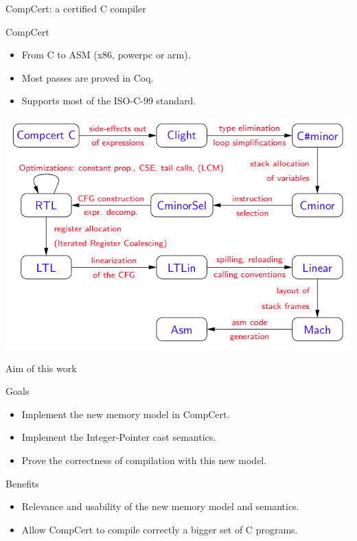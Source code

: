 \begin{frame}{CompCert: a certified C compiler}

  \begin{block}{CompCert}
    \begin{itemize}
      \item From C to ASM (x86, powerpc or arm).
      \item Most passes are proved in Coq.
      \item Supports most of the ISO-C-99 standard.
    \end{itemize}
  \end{block}
  \vfill
  \begin{center}
    \includegraphics[scale=0.6]{img/passes.png}
  \end{center}
  
\end{frame}


\begin{frame}{Aim of this work}
  
  \begin{block}{Goals}
    \begin{itemize}
    \item Implement the new memory model in CompCert.
    \item Implement the Integer-Pointer cast semantics.
    \item Prove the correctness of compilation with this new model.
    \end{itemize}
  \end{block}
  \vfill
  \begin{exampleblock}{Benefits}
    \begin{itemize}
    \item Relevance and usability of the new memory model and semantics.
    \item Allow CompCert to compile correctly a bigger set of C programs.
    \end{itemize}
  \end{exampleblock}

\end{frame}
